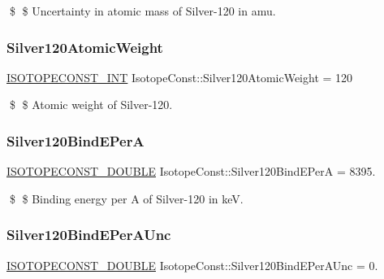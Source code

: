 \$ \$ Uncertainty in atomic mass of Silver-\/120 in amu. \mbox{\label{group___isotope_const-_silver-_ag120_gaa720a226f5f55dfda078c58937e00fa9}} 
\subsubsection{\texorpdfstring{Silver120\+Atomic\+Weight}{Silver120AtomicWeight}}
{\footnotesize\ttfamily \mbox{\hyperlink{group___isotope_const-_macros_ga5f18360b3e99483a35c32d789e62621c}{I\+S\+O\+T\+O\+P\+E\+C\+O\+N\+S\+T\+\_\+\+I\+NT}} Isotope\+Const\+::\+Silver120\+Atomic\+Weight = 120}

\$ \$ Atomic weight of Silver-\/120. \mbox{\label{group___isotope_const-_silver-_ag120_ga9680ff29f4ec06867123a50fa4582a7d}} 
\subsubsection{\texorpdfstring{Silver120\+Bind\+E\+PerA}{Silver120BindEPerA}}
{\footnotesize\ttfamily \mbox{\hyperlink{group___isotope_const-_macros_ga8f45a7272ce02c0b4c65c44636ed719a}{I\+S\+O\+T\+O\+P\+E\+C\+O\+N\+S\+T\+\_\+\+D\+O\+U\+B\+LE}} Isotope\+Const\+::\+Silver120\+Bind\+E\+PerA = 8395.}

\$ \$ Binding energy per A of Silver-\/120 in keV. \mbox{\label{group___isotope_const-_silver-_ag120_ga9ba5b87cae22e35d60585672b0bb0a22}} 
\subsubsection{\texorpdfstring{Silver120\+Bind\+E\+Per\+A\+Unc}{Silver120BindEPerAUnc}}
{\footnotesize\ttfamily \mbox{\hyperlink{group___isotope_const-_macros_ga8f45a7272ce02c0b4c65c44636ed719a}{I\+S\+O\+T\+O\+P\+E\+C\+O\+N\+S\+T\+\_\+\+D\+O\+U\+B\+LE}} Isotope\+Const\+::\+Silver120\+Bind\+E\+Per\+A\+Unc = 0.}

